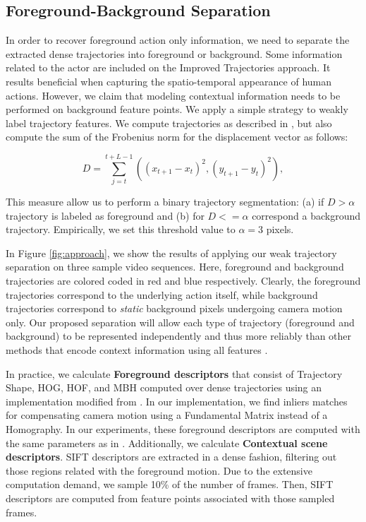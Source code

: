\subsection{Foreground-Background Separation}
In order to recover foreground action only information, we need to separate the extracted dense trajectories into foreground or background. Some information related to the actor are included on the Improved Trajectories approach. It results beneficial when capturing the spatio-temporal appearance of human actions. However, we claim that modeling contextual information needs to be performed on background feature points.  We apply a simple strategy to weakly label trajectory features. We compute trajectories as described in \cite{wang2013}, but also compute the sum of the Frobenius norm for the displacement vector as follows:

\begin{equation}
D = \sum _{j=t}^{t+L-1}\left ( (x_{t+1}-x_t)^2, (y_{t+1}-y_t)^2 \right ),
\end{equation}

This measure allow us to perform a binary trajectory segmentation: (a) if $D>\alpha$ trajectory is labeled as foreground and (b) for $D<=\alpha$ correspond a background trajectory. Empirically, we set this threshold value to $\alpha=3$ pixels. 

In Figure \ref{fig:approach}, we show the results of applying our weak trajectory separation on three sample video sequences. Here, foreground and background trajectories are colored coded in red and blue respectively. Clearly, the foreground trajectories correspond to the underlying action itself, while background trajectories correspond to \emph{static} background pixels undergoing camera motion only. Our proposed separation will allow each type of trajectory (foreground and background) to be represented independently and thus more reliably than other methods that encode context information using all features \cite{marszalek2009}.

In practice, we calculate \textbf{Foreground descriptors} that consist of Trajectory Shape, HOG, HOF, and MBH computed over dense trajectories using an implementation modified from \cite{wang2013}. In our implementation, we find inliers matches for compensating camera motion using a Fundamental Matrix instead of a Homography. In our experiments, these foreground descriptors are computed with the same parameters as in \cite{wang2013}.
Additionally, we calculate \textbf{Contextual scene descriptors}. SIFT descriptors are extracted in a dense fashion, filtering out those regions related with the foreground motion. Due to the extensive computation demand, we sample 10\% of the number of frames. Then, SIFT descriptors are computed from feature points associated with those sampled frames.



